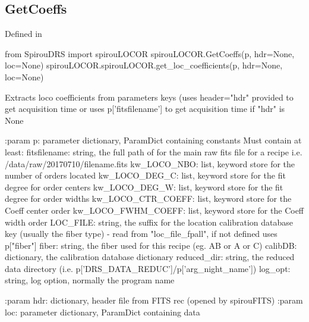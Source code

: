 \noindent\begin{minipage}{\textwidth}
\subsection{GetCoeffs}

Defined in \spirouLOCOR{}

\begin{pythonbox}
from SpirouDRS import spirouLOCOR
spirouLOCOR.GetCoeffs(p, hdr=None, loc=None)
spirouLOCOR.spirouLOCOR.get_loc_coefficients(p, hdr=None, loc=None)
\end{pythonbox}

\begin{pythondocstring}
Extracts loco coefficients from parameters keys (uses header="hdr" provided
to get acquisition time or uses p['fitsfilename'] to get acquisition time if
"hdr" is None

:param p: parameter dictionary, ParamDict containing constants
    Must contain at least:
            fitsfilename: string, the full path of for the main raw fits
                          file for a recipe
                          i.e. /data/raw/20170710/filename.fits
            kw_LOCO_NBO: list, keyword store for the number of orders
                         located
            kw_LOCO_DEG_C: list, keyword store for the fit degree for
                           order centers
            kw_LOCO_DEG_W: list, keyword store for the fit degree for
                           order widths
            kw_LOCO_CTR_COEFF: list, keyword store for the Coeff center
                               order
            kw_LOCO_FWHM_COEFF: list, keyword store for the Coeff width
                                order
            LOC_FILE: string, the suffix for the location calibration
                      database key (usually the fiber type)
                         - read from "loc_file_fpall", if not defined
                           uses p["fiber"]
            fiber: string, the fiber used for this recipe (eg. AB or A or C)
            calibDB: dictionary, the calibration database dictionary
            reduced_dir: string, the reduced data directory
                         (i.e. p['DRS_DATA_REDUC']/p['arg_night_name'])
            log_opt: string, log option, normally the program name

:param hdr: dictionary, header file from FITS rec (opened by spirouFITS)
:param loc: parameter dictionary, ParamDict containing data


\end{pythondocstring}
\end{minipage}
